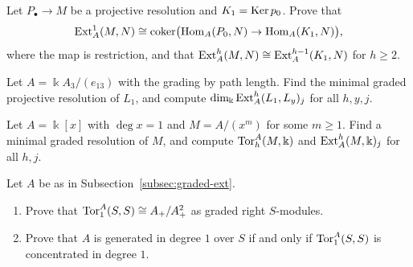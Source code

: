 \begin{exercise}
Let $P_\bullet\to M$ be a projective resolution and $K_1=\operatorname{Ker}\nolimits p_0$.
Prove that
\[
\operatorname{Ext}\nolimits_A^1(M,N)\cong\operatorname{coker}\bigl(\operatorname{Hom}\nolimits_A(P_0,N)\to\operatorname{Hom}\nolimits_A(K_1,N)\bigr),
\]
where the map is restriction, and that $\operatorname{Ext}\nolimits_A^h(M,N)\cong\operatorname{Ext}\nolimits_A^{h-1}(K_1,N)$ for $h\geq2$.
\end{exercise}

\begin{exercise}
Let $A=\Bbbk A_3/(e_{13})$ with the grading by path length.
Find the minimal graded projective resolution of $L_1$, and compute $\dim_\Bbbk\operatorname{Ext}\nolimits_A^h(L_1,L_y)_j$ for all $h,y,j$.
\end{exercise}

\begin{exercise}
Let $A=\Bbbk[x]$ with $\deg x=1$ and $M=A/(x^m)$ for some $m\geq1$.
Find a minimal graded resolution of $M$, and compute $\operatorname{Tor}\nolimits_h^A(M,\Bbbk)$ and $\operatorname{Ext}\nolimits_A^h(M,\Bbbk)_j$ for all $h,j$.
\end{exercise}

\begin{exercise}
Let $A$ be as in Subsection~\ref{subsec:graded-ext}.
\begin{enumerate}
\item Prove that $\operatorname{Tor}\nolimits_1^A(S,S)\cong A_+/A_+^2$ as graded right $S$-modules.
\item Prove that $A$ is generated in degree $1$ over $S$ if and only if $\operatorname{Tor}\nolimits_1^A(S,S)$ is concentrated in degree $1$.
\end{enumerate}
\end{exercise}
